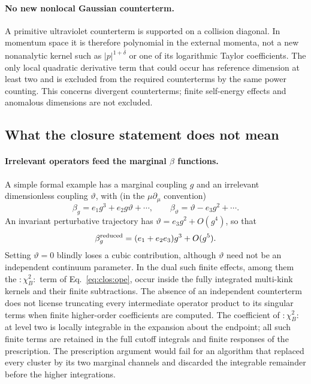 \documentclass[11pt,a4paper]{article}
\numberwithin{equation}{section}
\newcommand{\db}{\bar\delta}
\begin{document}
\paragraph{No new nonlocal Gaussian counterterm.} A primitive ultraviolet counterterm is supported on a collision
diagonal. In momentum space it is therefore polynomial in the external momenta, not a new nonanalytic kernel such as
$|p|^{1+\db}$ or one of its logarithmic Taylor coefficients. The only local quadratic derivative term that could occur
has reference dimension at least two and is excluded from the required counterterms by the same power counting. This
concerns divergent counterterms; finite self-energy effects and anomalous dimensions are not excluded.

\subsection{What the closure statement does not mean}\label{app:clos:notmean}
\paragraph{Irrelevant operators feed the marginal \texorpdfstring{$\beta$}{beta} functions.} A simple formal example has
a marginal coupling $g$ and an irrelevant dimensionless coupling $\vartheta$, with (in the $\mu\partial_\mu$
convention)
\begin{equation}
 \beta_g=e_1g^3+e_2g\vartheta+\cdots,\qquad \beta_\vartheta=\vartheta-e_3g^2+\cdots .
\end{equation}
An invariant perturbative trajectory has $\vartheta=e_3g^2+O(g^4)$, so that
\begin{equation}
 \beta_g^{\rm reduced}=(e_1+e_2e_3)g^3+O(g^5).
\end{equation}
Setting $\vartheta=0$ blindly loses a cubic contribution, although $\vartheta$ need not be an independent continuum
parameter. In the dual such finite effects, among them the ${:}\chi_B^2{:}$ term of Eq.~\eqref{eq:clos:ope}, occur inside
the fully integrated multi-kink kernels and their finite subtractions. The absence of an independent counterterm does
not license truncating every intermediate operator product to its singular terms when finite higher-order coefficients
are computed. The coefficient of ${:}\chi_B^2{:}$ at level two is locally integrable in the expansion about the
endpoint; all such finite terms are retained in the full cutoff integrals and finite responses of the prescription.
The prescription argument would fail for an algorithm that replaced every cluster by its two marginal channels and
discarded the integrable remainder before the higher integrations.
\end{document}
